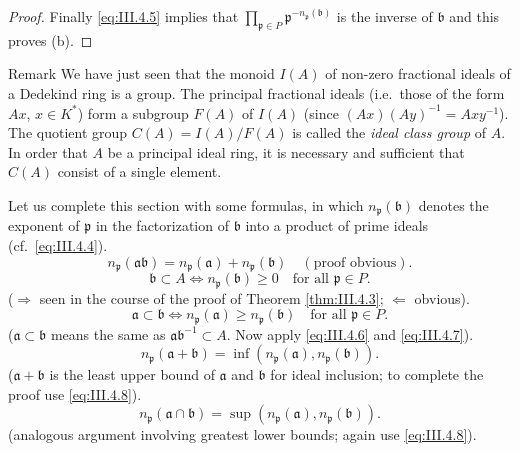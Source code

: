 \begin{proof}
Finally \eqref{eq:III.4.5} implies that
$\prod_{\mathfrak{p}\in P}\mathfrak{p}^{-n_{\mathfrak{p}}(\mathfrak{b})}$ is
the inverse of $\mathfrak{b}$ and this proves (b).
\end{proof}

\begin{statement}{Remark}
We have just seen that the monoid $I(A)$ of non-zero fractional ideals of a
Dedekind ring is a group. The principal fractional ideals (i.e.\ those of the
form $Ax$, $x\in K^{*}$) form a subgroup $F(A)$ of $I(A)$ (since
$(Ax)(Ay)^{-1}=Axy^{-1}$). The quotient group $C(A)=I(A)/F(A)$ is called the
\emph{ideal class group} of $A$. In order that $A$ be a principal ideal ring,
it is necessary and sufficient that $C(A)$ consist of a single element.
\end{statement}

Let us complete this section with some formulas, in which
$n_{\mathfrak{p}}(\mathfrak{b})$ denotes the exponent of $\mathfrak{p}$ in the
factorization of $\mathfrak{b}$ into a product of prime ideals (cf.\
\eqref{eq:III.4.4}).
\begin{equation}
n_{\mathfrak{p}}(\mathfrak{a}\mathfrak{b})
=n_{\mathfrak{p}}(\mathfrak{a})+n_{\mathfrak{p}}(\mathfrak{b})
\quad(\text{proof obvious}).
\label{eq:III.4.6}
\end{equation}
\begin{equation}
\mathfrak{b}\subset A\Leftrightarrow
n_{\mathfrak{p}}(\mathfrak{b})\geq0\quad\text{for all }
\mathfrak{p}\in P.
\label{eq:III.4.7}
\end{equation}
($\Rightarrow$ seen in the course of the proof of Theorem \ref{thm:III.4.3};
$\Leftarrow$ obvious).
\begin{equation}
\mathfrak{a}\subset\mathfrak{b}\Leftrightarrow
n_{\mathfrak{p}}(\mathfrak{a})\geq n_{\mathfrak{p}}(\mathfrak{b})
\quad\text{for all }\mathfrak{p}\in P.
\label{eq:III.4.8}
\end{equation}
($\mathfrak{a}\subset\mathfrak{b}$ means the same as
$\mathfrak{a}\mathfrak{b}^{-1}\subset A$. Now apply \eqref{eq:III.4.6} and
\eqref{eq:III.4.7}).
\begin{equation}
n_{\mathfrak{p}}(\mathfrak{a}+\mathfrak{b})
=\inf(n_{\mathfrak{p}}(\mathfrak{a}),n_{\mathfrak{p}}(\mathfrak{b})).
\label{eq:III.4.9}
\end{equation}
($\mathfrak{a}+\mathfrak{b}$ is the least upper bound of $\mathfrak{a}$ and
$\mathfrak{b}$ for ideal inclusion; to complete the proof use
\eqref{eq:III.4.8}).
\begin{equation}
n_{\mathfrak{p}}(\mathfrak{a}\cap\mathfrak{b})
=\sup(n_{\mathfrak{p}}(\mathfrak{a}),n_{\mathfrak{p}}(\mathfrak{b})).
\label{eq:III.4.10}
\end{equation}
(analogous argument involving greatest lower bounds; again use
\eqref{eq:III.4.8}).

